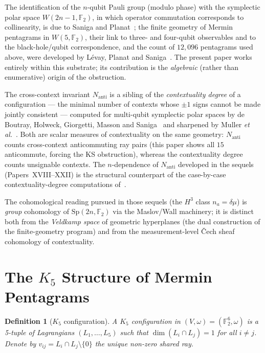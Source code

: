 \documentclass[11pt,a4paper]{article}
\newtheorem{definition}[theorem]{Definition}
\theoremstyle{remark}
\begin{document}
The identification of the $n$-qubit Pauli group (modulo phase) with the symplectic
polar space $W(2n-1,\mathbb{F}_2)$, in which operator commutation corresponds to
collinearity, is due to Saniga and Planat~\cite{SanigaPlanat}; the finite geometry
of Mermin pentagrams in $W(5,\mathbb{F}_2)$, their link to three- and four-qubit
observables and to the black-hole/qubit correspondence, and the count of $12{,}096$
pentagrams used above, were developed by L\'evay, Planat and
Saniga~\cite{LevayPlanatSaniga}. The present paper works entirely within this
substrate; its contribution is the \emph{algebraic} (rather than enumerative)
origin of the obstruction.

The cross-context invariant $N_{\mathrm{anti}}$ is a sibling of the
\emph{contextuality degree} of a configuration --- the minimal number of contexts
whose $\pm1$ signs cannot be made jointly consistent --- computed for multi-qubit
symplectic polar spaces by de Boutray, Holweck, Giorgetti, Masson and
Saniga~\cite{deBoutray} and sharpened by Muller \emph{et al.}~\cite{Muller}. Both
are scalar measures of contextuality on the same geometry: $N_{\mathrm{anti}}$
counts cross-context anticommuting ray pairs (this paper shows all $15$ anticommute,
forcing the KS obstruction), whereas the contextuality degree counts unsignable
contexts. The $n$-dependence of $N_{\mathrm{anti}}$ developed in the sequels
(Papers~XVIII--XXII) is the structural counterpart of the case-by-case
contextuality-degree computations of~\cite{deBoutray,Muller}.

The cohomological reading pursued in those sequels (the $H^3$ class
$n_a=\delta\mu$) is \emph{group} cohomology of $\mathrm{Sp}(2n,\mathbb{F}_2)$ via
the Maslov/Wall machinery; it is distinct both from the \emph{Veldkamp space} of
geometric hyperplanes (the dual construction of the finite-geometry program) and
from the measurement-level \v{C}ech sheaf cohomology of contextuality.


\section{\texorpdfstring{The $K_5$ Structure of Mermin Pentagrams}{The K5 Structure of Mermin Pentagrams}}\label{sec:k5}

\begin{definition}[$K_5$ configuration]\label{def:k5}
A \emph{$K_5$ configuration} in $(V, \omega) = (\mathbb{F}_2^6, \omega)$
is a 5-tuple of Lagrangians $(L_1, \ldots, L_5)$ such that
$\dim(L_i \cap L_j) = 1$ for all $i \neq j$.
Denote by $v_{ij} = L_i \cap L_j \setminus \{0\}$
the unique non-zero shared ray.
\end{definition}
\end{document}
